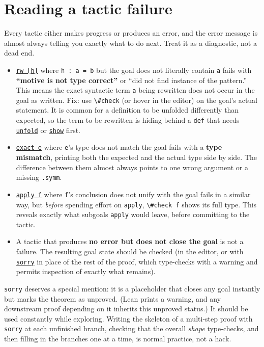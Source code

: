 \section{Reading a tactic failure}\label{sec:04-tactics:03-reading-failures:1}

Every tactic either makes progress or produces an error, and the error message is almost always telling you exactly what to do next. Treat it as a diagnostic, not a dead end.

\begin{itemize}
\tightlist
\item
  \href{https://lean-lang.org/doc/reference/latest/Tactic-Proofs/Tactic-Reference/}{\texttt{rw [h]}} where \texttt{h : a = b} but the goal does not literally contain \texttt{a} fails with \textbf{``motive is not type correct''} or ``did not find instance of the pattern.'' This means the exact syntactic term \texttt{a} being rewritten does not occur in the goal as written. Fix: use \texttt{\textbackslash{}\#check} (or hover in the editor) on the goal's actual statement. It is common for a definition to be unfolded differently than expected, so the term to be rewritten is hiding behind a \texttt{def} that needs \href{https://lean-lang.org/doc/reference/latest/Tactic-Proofs/Tactic-Reference/}{\texttt{unfold}} or \href{https://lean-lang.org/doc/reference/latest/Tactic-Proofs/Tactic-Reference/}{\texttt{show}} first.
\item
  \href{https://lean-lang.org/doc/reference/latest/Tactic-Proofs/Tactic-Reference/}{\texttt{exact e}} where \texttt{e}'s type does not match the goal fails with a \textbf{type mismatch}, printing both the expected and the actual type side by side. The difference between them almost always points to one wrong argument or a missing \texttt{.symm}.
\item
  \href{https://lean-lang.org/doc/reference/latest/Tactic-Proofs/Tactic-Reference/}{\texttt{apply f}} where \texttt{f}'s conclusion does not unify with the goal fails in a similar way, but \emph{before} spending effort on \texttt{apply}, \texttt{\textbackslash{}\#check f} shows its full type. This reveals exactly what subgoals \texttt{apply} would leave, before committing to the tactic.
\item
  A tactic that produces \textbf{no error but does not close the goal} is not a failure. The resulting goal state should be checked (in the editor, or with \href{https://lean-lang.org/doc/reference/latest/Tactic-Proofs/Tactic-Reference/}{\texttt{sorry}} in place of the rest of the proof, which type-checks with a warning and permits inspection of exactly what remains).
\end{itemize}

\texttt{sorry} deserves a special mention: it is a placeholder that closes any goal instantly but marks the theorem as unproved. (Lean prints a warning, and any downstream proof depending on it inherits this unproved status.) It should be used constantly while exploring. Writing the skeleton of a multi-step proof with \texttt{sorry} at each unfinished branch, checking that the overall \emph{shape} type-checks, and then filling in the branches one at a time, is normal practice, not a hack.
